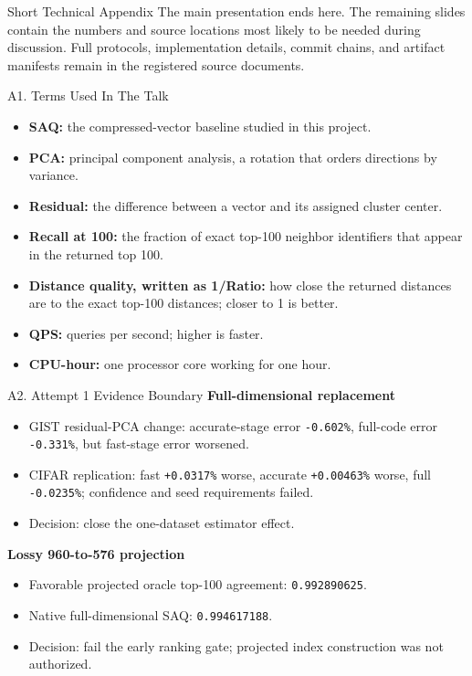 \documentclass[
  ignorenonframetext,
  aspectratio=169,
]{beamer}
\providecommand{\tightlist}{%
  \setlength{\itemsep}{0pt}\setlength{\parskip}{0pt}}
\begin{document}
\begin{frame}{Short Technical Appendix}
The main presentation ends here. The remaining slides contain the
numbers and source locations most likely to be needed during discussion.
Full protocols, implementation details, commit chains, and artifact
manifests remain in the registered source documents.
\end{frame}

\begin{frame}{A1. Terms Used In The Talk}
\protect{}\label{a1-terms-used-in-the-talk}
\begin{itemize}
\tightlist
\item
  \textbf{SAQ:} the compressed-vector baseline studied in this project.
\item
  \textbf{PCA:} principal component analysis, a rotation that orders
  directions by variance.
\item
  \textbf{Residual:} the difference between a vector and its assigned
  cluster center.
\item
  \textbf{Recall at 100:} the fraction of exact top-100 neighbor
  identifiers that appear in the returned top 100.
\item
  \textbf{Distance quality, written as 1/Ratio:} how close the returned
  distances are to the exact top-100 distances; closer to 1 is better.
\item
  \textbf{QPS:} queries per second; higher is faster.
\item
  \textbf{CPU-hour:} one processor core working for one hour.
\end{itemize}
\end{frame}

\begin{frame}[fragile]{A2. Attempt 1 Evidence Boundary}
\protect{}\label{a2-attempt-1-evidence-boundary}
\textbf{Full-dimensional replacement}

\begin{itemize}
\tightlist
\item
  GIST residual-PCA change: accurate-stage error \texttt{-0.602\%},
  full-code error \texttt{-0.331\%}, but fast-stage error worsened.
\item
  CIFAR replication: fast \texttt{+0.0317\%} worse, accurate
  \texttt{+0.00463\%} worse, full \texttt{-0.0235\%}; confidence and
  seed requirements failed.
\item
  Decision: close the one-dataset estimator effect.
\end{itemize}

\textbf{Lossy 960-to-576 projection}

\begin{itemize}
\tightlist
\item
  Favorable projected oracle top-100 agreement: \texttt{0.992890625}.
\item
  Native full-dimensional SAQ: \texttt{0.994617188}.
\item
  Decision: fail the early ranking gate; projected index construction
  was not authorized.
\end{itemize}

\end{frame}
\end{document}
